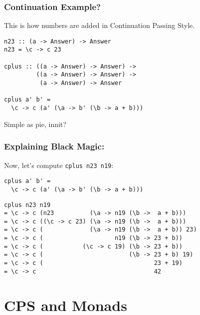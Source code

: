 \documentclass{beamer}
\begin{document}
\begin{frame}[fragile]
\frametitle{Continuation Example?}
\lstset{basicstyle=\footnotesize\ttfamily}
This is how numbers are added in Continuation Passing Style.
\begin{lstlisting}
n23 :: (a -> Answer) -> Answer
n23 = \c -> c 23

cplus :: ((a -> Answer) -> Answer) -> 
         ((a -> Answer) -> Answer) -> 
          (a -> Answer) -> Answer
          
cplus a' b' = 
  \c -> c (a' (\a -> b' (\b -> a + b)))
\end{lstlisting}
\pause Simple as pie, innit?
\end{frame}

\begin{frame}[fragile]
\frametitle{Explaining Black Magic:}
\lstset{basicstyle=\footnotesize\ttfamily}
Now, let's compute \texttt{cplus n23 n19}: 
\begin{lstlisting}
cplus a' b' = 
  \c -> c (a' (\a -> b' (\b -> a + b)))
\end{lstlisting}
\pause
\begin{lstlisting}
cplus n23 n19
= \c -> c (n23          (\a -> n19 (\b ->  a + b))) 
= \c -> c ((\c -> c 23) (\a -> n19 (\b ->  a + b)))
= \c -> c (             (\a -> n19 (\b ->  a + b)) 23)
= \c -> c (                    n19 (\b -> 23 + b))
= \c -> c (           (\c -> c 19) (\b -> 23 + b))
= \c -> c (                        (\b -> 23 + b) 19)
= \c -> c (                               23 + 19)
= \c -> c                                 42
\end{lstlisting}
\lstset{language=Haskell}


\end{frame}


\section{CPS and Monads}
\end{document}
